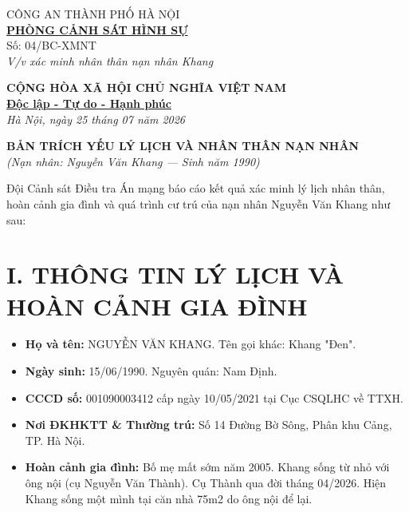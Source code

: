 \documentclass[12pt,a4paper]{article}
\begin{document}
\noindent
\begin{minipage}[t]{0.45\textwidth}
    \begin{center}
        \small
        CÔNG AN THÀNH PHỐ HÀ NỘI\\
        \textbf{\underline{PHÒNG CẢNH SÁT HÌNH SỰ}}\\[0.1cm]
        Số: 04/BC-XMNT\\
        \textit{V/v xác minh nhân thân nạn nhân Khang}
    \end{center}
\end{minipage}
\hfill
\begin{minipage}[t]{0.52\textwidth}
    \begin{center}
        \small
        \textbf{CỘNG HÒA XÃ HỘI CHỦ NGHĨA VIỆT NAM}\\
        \textbf{\underline{Độc lập - Tự do - Hạnh phúc}}\\[0.1cm]
        \textit{Hà Nội, ngày 25 tháng 07 năm 2026}
    \end{center}
\end{minipage}

\vspace{0.6cm}

\begin{center}
    \textbf{\large BẢN TRÍCH YẾU LÝ LỊCH VÀ NHÂN THÂN NẠN NHÂN}\\
    \textit{(Nạn nhân: Nguyễn Văn Khang — Sinh năm 1990)}
\end{center}

\vspace{0.3cm}

\noindent Đội Cảnh sát Điều tra Án mạng báo cáo kết quả xác minh lý lịch nhân thân, hoàn cảnh gia đình và quá trình cư trú của nạn nhân Nguyễn Văn Khang như sau:

\section*{I. THÔNG TIN LÝ LỊCH VÀ HOÀN CẢNH GIA ĐÌNH}
\begin{itemize}[leftmargin=1.5cm]
    \item \textbf{Họ và tên:} NGUYỄN VĂN KHANG. Tên gọi khác: Khang "Đen".
    \item \textbf{Ngày sinh:} 15/06/1990. Nguyên quán: Nam Định.
    \item \textbf{CCCD số:} 001090003412 cấp ngày 10/05/2021 tại Cục CSQLHC về TTXH.
    \item \textbf{Nơi ĐKHKTT \& Thường trú:} Số 14 Đường Bờ Sông, Phân khu Cảng, TP. Hà Nội.
    \item \textbf{Hoàn cảnh gia đình:} Bố mẹ mất sớm năm 2005. Khang sống từ nhỏ với ông nội (cụ Nguyễn Văn Thành). Cụ Thành qua đời tháng 04/2026. Hiện Khang sống một mình tại căn nhà 75m2 do ông nội để lại.
\end{itemize}
\end{document}
